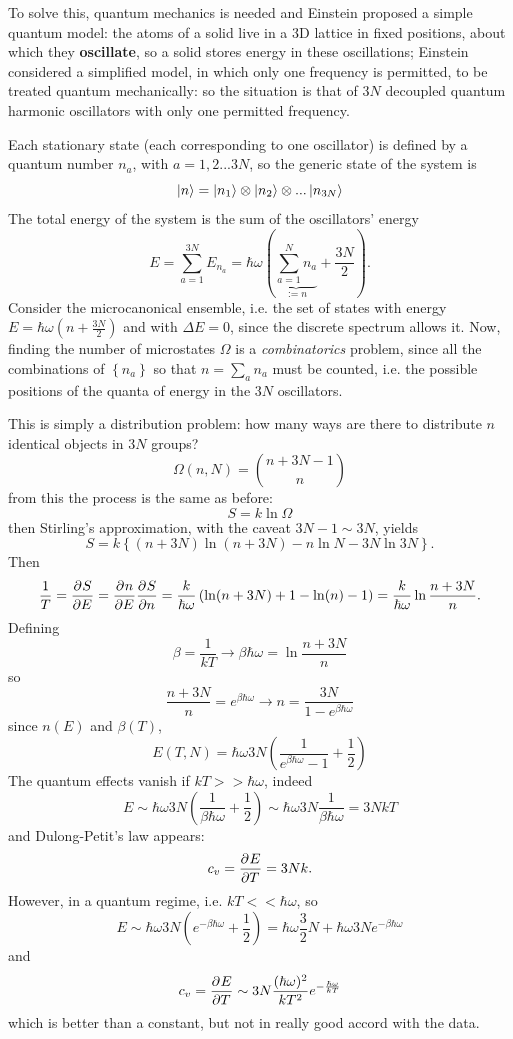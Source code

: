 To solve this, quantum mechanics is needed and
Einstein proposed a simple quantum model: the atoms of a solid live in a 3D
lattice in fixed positions, about which they \textbf{oscillate}, so a solid stores
energy in these oscillations; Einstein considered a simplified model, in which
only one frequency is permitted, to be treated quantum mechanically: so the
situation is that of $3N$ decoupled quantum harmonic oscillators with only
one permitted frequency.

Each stationary state (each corresponding to one oscillator) is defined by a
quantum number $n_a$, with $a=1,2...3N$, so the generic state of the system is
$$\ket{n} = \ket{n_1}\otimes\ket{n_2}\otimes...\ket{n_{3N}}$$
The total energy of the system is the sum of the oscillators' energy
$$E = \sum_{a=1}^{3N}E_{n_a} = \hbar\omega \left(\underbrace{\sum_{a=1}^{N}n_a}_
{:=n}+\frac{3N}{2}\right).$$
Consider the microcanonical ensemble, i.e. the set of states with energy
$E=\hbar\omega\left(n+\frac{3N}{2}\right)$ and with $\Delta E=0$, since the
discrete spectrum allows it. Now, finding the number of microstates $\Omega$
is a \textit{combinatorics} problem, since all the combinations of
$\left\{n_a\right\}$ so that $n=\sum_{a}^{}n_a$ must be counted, i.e. the
possible positions of the quanta of energy in the $3N$ oscillators.

This is simply a distribution problem: how many ways are there to distribute $n$
identical objects in $3N$ groups?
$$\Omega(n,N) =
\binom{n+3N-1}{n}
$$
from this the process is the same as before:
$$S = k\ln\Omega$$
then Stirling's approximation, with the caveat $3N-1\sim3N$, yields
$$S = k \left\{(n+3N)\ln(n+3N)-n\ln N -3N\ln3N\right\}.$$
Then
$$\frac{1}{T} = \pdv[]{S}{E} = \pdv[]{n}{E}\pdv[]{S}{n} = \frac{k}{\hbar\omega}
\left(\ln(n+3N)+1 -\ln(n)-1\right)=\frac{k}{\hbar\omega} \ln\frac{n+3N}{n}.
$$
Defining
$$\beta = \frac{1}{kT}\to \beta\hbar\omega = \ln\frac{n+3N}{n}$$
so
$$\frac{n+3N}{n}=e^{\beta\hbar\omega} \to n = \frac{3N}{1-e^{\beta\hbar\omega}}$$
since $n(E)$ and $\beta(T)$,
$$E(T,N) = \hbar\omega3N\left(\frac{1}{e^{\beta\hbar\omega}-1} + \frac{1}{2}
\right)$$
The quantum effects vanish if $kT>>\hbar\omega$, indeed
$$E\sim\hbar\omega3N\left(\frac{1}{\beta\hbar\omega}+\frac{1}{2}\right)\sim
\hbar\omega3N\frac{1}{\beta\hbar\omega} = 3NkT$$
and Dulong-Petit's law appears:
$$c_v = \pdv[]{E}{T} = 3Nk.$$
However, in a quantum regime, i.e. $kT<<\hbar\omega$, so
$$E\sim\hbar\omega3N\left(e^{-\beta\hbar\omega}+\frac{1}{2}\right) = 
\hbar\omega\frac{3}{2}N + \hbar\omega3Ne^{-\beta\hbar\omega}$$
and
$$c_v = \pdv[]{E}{T} \sim 3N\frac{(\hbar\omega)^2}{kT^2}e^{-\frac{\hbar\omega}
{kT}}$$
which is better than a constant, but not in really good accord with the data.
